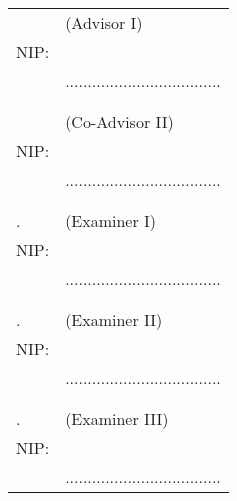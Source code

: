 \noindent
\begin{tabularx}{\textwidth}{X l}
  \advisor{}               & (Advisor I)                         \\
  NIP: \advisornip{}       &                                     \\
                           & ................................... \\
                           &                                     \\
                           &                                     \\
  \coadvisor{}             & (Co-Advisor II)                     \\
  NIP: \coadvisornip{}     &                                     \\
                           & ................................... \\
                           &                                     \\
                           &                                     \\
  \examinerone{}.          & (Examiner I)                        \\
  NIP: \examineronenip{}   &                                     \\
                           & ................................... \\
                           &                                     \\
                           &                                     \\
  \examinertwo{}.          & (Examiner II)                       \\
  NIP: \examinertwonip{}   &                                     \\
                           & ................................... \\
                           &                                     \\
                           &                                     \\
  \examinerthree{}.        & (Examiner III)                      \\
  NIP: \examinerthreenip{} &                                     \\
                           & ................................... \\
\end{tabularx}
\endgroup

